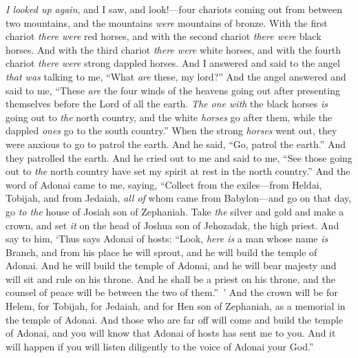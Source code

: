 \begin{biblechapter} %
 \textit{I looked up again}, and I saw, and look!—four chariots coming out from between two mountains, and the mountains \textit{were} mountains of bronze.
\verse With the first chariot \textit{there were} red horses, and with the second chariot \textit{there were} black horses.
\verse And with the third chariot \textit{there were} white horses, and with the fourth chariot \textit{there were} strong dappled horses.
\verse And I answered and said to the angel \textit{that was} talking to me, “What \textit{are} these, my lord?”
\verse And the angel answered and said to me, “These \textit{are} the four winds of the heavens going out after presenting themselves before the Lord of all the earth.
\verse \textit{The one with} the black horses \textit{is} going out to \textit{the} north country, and the white \textit{horses} go after them, while the dappled \textit{ones} go to the south country.”
\verse When the strong \textit{horses} went out, they were anxious to go to patrol the earth. And he said, “Go, patrol the earth.” And they patrolled the earth.
\verse And he cried out to me and said to me, “See those going out to \textit{the} north country have set my spirit at rest in the north country.”
 And the word of Adonai came to me, saying,
\verse “Collect from the exiles—from Heldai, Tobijah, and from Jedaiah, \textit{all of} whom came from Babylon—and go on that day, go \textit{to the} house of Josiah son of Zephaniah.
\verse Take \textit{the} silver and gold and make a crown, and set \textit{it} on the head of Joshua son of Jehozadak, the high priest.
\verse And say to him, ‘Thus says Adonai of hosts: “Look, \textit{here is} a man whose name \textit{is} Branch, and from his place he will sprout, and he will build the temple of Adonai.
\verse And he will build the temple of Adonai, and he will bear majesty and will sit and rule on his throne. And he shall be a priest on his throne, and the counsel of peace will be between the two of them.” ’
\verse And the crown will be for Helem, for Tobijah, for Jedaiah, and for Hen son of Zephaniah, as a memorial in the temple of Adonai.
\verse And those who are far off will come and build the temple of Adonai, and you will know that Adonai of hosts has sent me to you. And it will happen if you will listen diligently to the voice of Adonai your God.”
\end{biblechapter}

